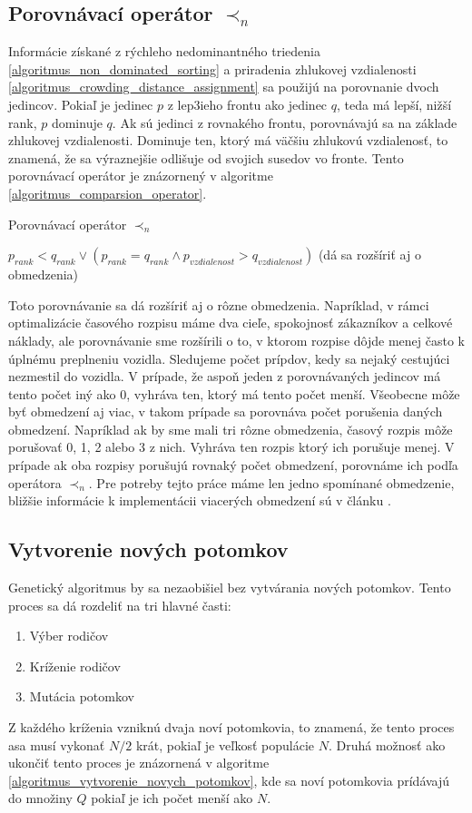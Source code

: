 \subsection*{Porovnávací operátor $\prec_n$}
Informácie získané z rýchleho nedominantného triedenia \ref{algoritmus_non_dominated_sorting} a priradenia zhlukovej vzdialenosti \ref{algoritmus_crowding_distance_assignment} sa použijú na porovnanie dvoch jedincov.
Pokiaľ je jedinec $p$ z lep3ieho frontu ako jedinec $q$, teda má lepší, nižší rank, $p$ dominuje $q$.
Ak sú jedinci z rovnakého frontu, porovnávajú sa na základe zhlukovej vzdialenosti.
Dominuje ten, ktorý má väčšiu zhlukovú vzdialenosť, to znamená, že sa výraznejšie odlišuje od svojich susedov vo fronte.
Tento porovnávací operátor je znázornený v algoritme \ref{algoritmus_comparsion_operator}.

\vspace*{\dimexpr 0.5\baselineskip\relax}
\begin{algorithm}[h]
\caption{Porovnávací operátor $\prec_n$}
\label{algoritmus_comparsion_operator}
  \Return $p_{rank} < q_{rank} \vee (p_{rank} = q_{rank} \wedge p_{vzdialenost} > q_{vzdialenost})$\;
  (dá sa rozšíriť aj o obmedzenia)\;
\end{algorithm}

Toto porovnávanie sa dá rozšíriť aj o rôzne obmedzenia.
Napríklad, v rámci optimalizácie časového rozpisu máme dva cieľe, spokojnosť zákazníkov a celkové náklady, ale porovnávanie sme rozšírili o to, v ktorom rozpise dôjde menej často k úplnému preplneniu vozidla.
Sledujeme počet prípdov, kedy sa nejaký cestujúci nezmestil do vozidla.
V prípade, že aspoň jeden z porovnávaných jedincov má tento počet iný ako 0, vyhráva ten, ktorý má tento počet menší.
Všeobecne môže byť obmedzení aj viac, v takom prípade sa porovnáva počet porušenia daných obmedzení.
Napríklad ak by sme mali tri rôzne obmedzenia, časový rozpis môže porušovať 0, 1, 2 alebo 3 z nich.
Vyhráva ten rozpis ktorý ich porušuje menej.
V prípade ak oba rozpisy porušujú rovnaký počet obmedzení, porovnáme ich podľa operátora $\prec_n$.
Pre potreby tejto práce máme len jedno spomínané obmedzenie, bližšie informácie k implementácii viacerých obmedzení sú v článku \cite{996017}.

\subsection*{Vytvorenie nových potomkov}
Genetický algoritmus by sa nezaobišiel bez vytvárania nových potomkov.
Tento proces sa dá rozdeliť na tri hlavné časti:
\begin{enumerate}
  \item Výber rodičov
  \item Kríženie rodičov
  \item Mutácia potomkov
\end{enumerate}
Z každého kríženia vzniknú dvaja noví potomkovia, to znamená, že tento proces asa musí vykonať $N/2$ krát, pokiaľ je veľkosť populácie $N$.
Druhá možnosť ako ukončiť tento proces je znázornená v algoritme \ref{algoritmus_vytvorenie_novych_potomkov}, kde sa noví potomkovia prídávajú do množiny $Q$ pokiaľ je ich počet menší ako $N$.

